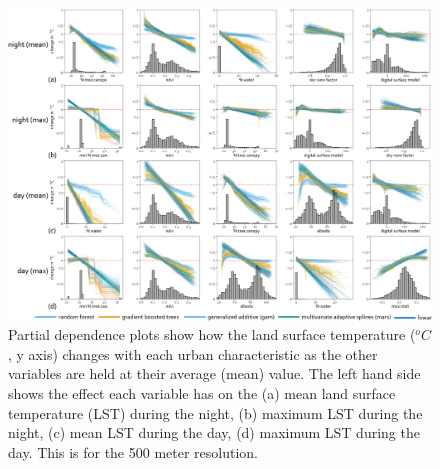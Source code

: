 \documentclass[final,3p,times,twocolumn,sort&compress]{elsarticle}
\begin{document}
\begin{figure}
    \centering
    \includegraphics[width=\linewidth]{fig/report/pdp_500.png}
    \caption[Partial dependence plots for LST at 500 meter resolution]{
    Partial dependence plots show how the land surface temperature ($^oC$, y axis) changes with each urban characteristic as the other variables are held at their average (mean) value. 
    The left hand side shows the effect each variable has on the (a) mean land surface temperature (LST) during the night, (b) maximum LST during the night, (c) mean LST during the day, (d) maximum LST during the day. 
    This is for the 500 meter resolution.
    }
    \label{fig:pdp_night_500}
\end{figure}
\end{document}
